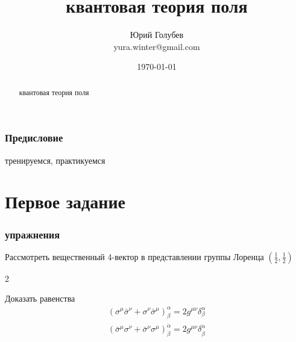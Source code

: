 \documentclass[a4paper,12pt]{article} %
\author{Юрий Голубев\\ yura.winter@gmail.com }
\title{квантовая теория поля}
\date{\today}
\begin{document}
\maketitle

\begin{abstract}
квантовая теория поля
\end{abstract}
\tableofcontents

\section*{Предисловие}

тренируемся, практикуемся


\clearpage
\part{Первое задание}


\section{упражнения}


\begin{task}

Рассмотреть вещественный 4-вектор в представлении группы Лоренца $\left(\frac{1}{2}, \frac{1}{2}\right)$






\end{task}




\begin{task}

2


Доказать равенства
$$
\begin{array}{l}
\left(\sigma^{\mu} \bar{\sigma}^{\nu}+\sigma^{\nu} \bar{\sigma}^{\mu}\right)_{\beta}^{\alpha}=2 g^{\mu \nu} \delta_{\beta}^{\alpha} \\
\left(\bar{\sigma}^{\mu} \sigma^{\nu}+\bar{\sigma}^{\nu} \sigma^{\mu}\right)_{\dot{\beta}}^{\dot{\alpha}}=2 g^{\mu \nu} \delta_{\dot{\beta}}^{\dot{\alpha}}
\end{array}
$$

\end{task}
\end{document}
